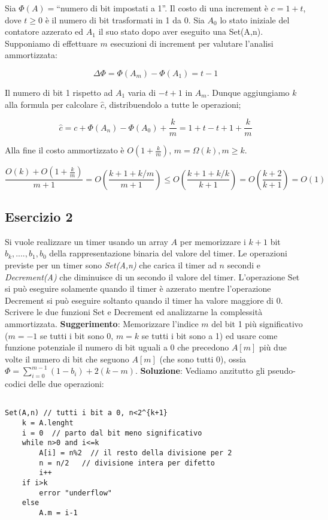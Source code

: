 Sia $\Phi(A)=$``numero di bit impostati a 1''. Il costo di una increment è $c=1+t$, dove $t\ge0$ è il numero di bit trasformati in 1 da 0. Sia $A_0$ lo stato iniziale del contatore azzerato ed $A_1$ il suo stato dopo aver eseguito una Set(A,n). Supponiamo di effettuare $m$ esecuzioni di increment per valutare l'analisi ammortizzata:

$$\Delta\Phi=\Phi(A_m)-\Phi(A_1)=t-1$$

Il numero di bit 1 rispetto ad $A_1$ varia di $-t+1$ in $A_m$. Dunque aggiungiamo $k$ alla formula per calcolare $\hat{c}$, distribuendolo a tutte le operazioni;

$$\hat{c}=c+\Phi(A_n)-\Phi(A_0)+\frac{k}{m}=1+t-t+1+\frac{k}{m}$$

Alla fine il costo ammortizzato è $O(1+\frac{k}{m})$, $m=\Omega(k), m\ge k$.

$$\frac{O(k)+O(1+\frac{k}{m})}{m+1}=O(\frac{k+1+k/m}{m+1})\le O(\frac{k+1+k/k}{k+1})=O(\frac{k+2}{k+1})=O(1)$$

\subsection{Esercizio 2}

Si vuole realizzare un timer usando un array $A$ per memorizzare i $k+1$ bit $b_k,....,b_1,b_0$ della rappresentazione binaria del valore del timer. Le operazioni previste per un timer sono \textit{Set(A,n)} che carica il timer ad $n$ secondi e \textit{Decrement(A)} che diminuisce di un secondo il valore del timer. L'operazione Set si può eseguire solamente quando il timer è azzerato mentre l'operazione Decrement si può eseguire soltanto quando il timer ha valore maggiore di 0. Scrivere le due funzioni Set e Decrement ed analizzarne la complessità ammortizzata.
\linebreak
\linebreak
\textbf{Suggerimento}: Memorizzare l'indice $m$ del bit 1 più significativo ($m=-1$ se tutti i bit sono 0, $m=k$ se tutti i bit sono a 1) ed usare come funzione potenziale il numero di bit uguali a 0 che precedono $A[m]$ più due volte il numero di bit che seguono $A[m]$ (che sono tutti 0), ossia $\Phi=\sum_{i=0}^{m-1}(1-b_i)+2(k-m)$.
\linebreak
\linebreak
\textbf{Soluzione}: Vediamo anzitutto gli pseudo-codici delle due operazioni:

\begin{lstlisting}

Set(A,n) // tutti i bit a 0, n<2^{k+1}
	k = A.lenght
	i = 0  // parto dal bit meno significativo
	while n>0 and i<=k
		A[i] = n%2  // il resto della divisione per 2
		n = n/2   // divisione intera per difetto
		i++
	if i>k
		error "underflow"
	else
		A.m = i-1

\end{lstlisting}

